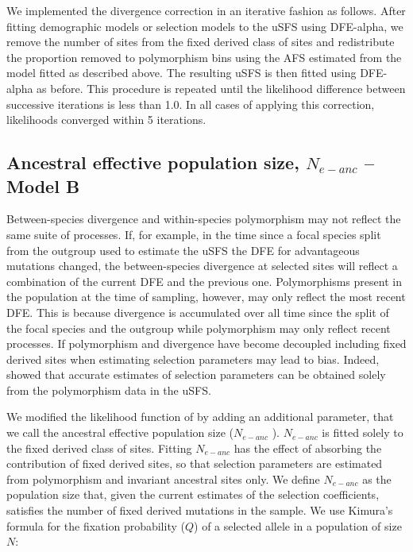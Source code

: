 We implemented the divergence correction in an iterative fashion as follows. After fitting demographic models or selection models to the uSFS using DFE-alpha, we remove the number of sites from the fixed derived class of sites and redistribute the proportion removed to polymorphism bins using the AFS estimated from the model fitted as described above. The resulting uSFS is then fitted using DFE-alpha as before. This procedure is repeated until the likelihood difference between successive iterations is less than 1.0. In all cases of applying this correction, likelihoods converged within 5 iterations.

\subsection{Ancestral effective population size, $N_{e-anc}$ – Model B}

Between-species divergence and within-species polymorphism may not reflect the same suite of processes. If, for example, in the time since a focal species split from the outgroup used to estimate the uSFS the DFE for advantageous mutations changed, the between-species divergence at selected sites will reflect a combination of the current DFE and the previous one. Polymorphisms present in the population at the time of sampling, however, may only reflect the most recent DFE. This is because divergence is accumulated over all time since the split of the focal species and the outgroup while polymorphism may only reflect recent processes. If polymorphism and divergence have become decoupled including fixed derived sites when estimating selection parameters may lead to bias. Indeed,  \cite{RN354} showed that accurate estimates of selection parameters can be obtained solely from the polymorphism data in the uSFS. 

We modified the likelihood function of \cite{RN210} by adding an additional parameter, that we call the ancestral effective population size ($N_{e-anc}$ ). $N_{e-anc}$  is fitted solely to the fixed derived class of sites. Fitting $N_{e-anc}$  has the effect of absorbing the contribution of fixed derived sites, so that selection parameters are estimated from polymorphism and invariant ancestral sites only. We define $N_{e-anc}$ as the population size that, given the current estimates of the selection coefficients, satisfies the number of fixed derived mutations in the sample. We use Kimura’s formula for the fixation probability ($Q$) of a selected allele in a population of size $N$:

